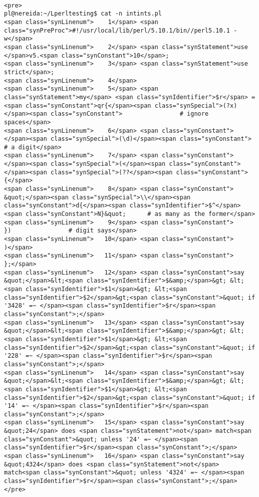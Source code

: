 \begin{verbatim}

<pre>
pl@nereida:~/Lperltesting$ cat -n intints.pl
<span class="synLinenum">    1</span> <span class="synPreProc">#!/usr/local/lib/perl/5.10.1/bin//perl5.10.1 -w</span>
<span class="synLinenum">    2</span> <span class="synStatement">use </span>v5.<span class="synConstant">10</span>;
<span class="synLinenum">    3</span> <span class="synStatement">use strict</span>;
<span class="synLinenum">    4</span> 
<span class="synLinenum">    5</span> <span class="synStatement">my</span> <span class="synIdentifier">$r</span> = <span class="synConstant">qr{</span><span class="synSpecial">(?x)</span><span class="synConstant">                # ignore spaces</span>
<span class="synLinenum">    6</span> <span class="synConstant">           </span><span class="synSpecial">(\d)</span><span class="synConstant">                # a digit</span>
<span class="synLinenum">    7</span> <span class="synConstant">           </span><span class="synSpecial">(</span><span class="synConstant"> </span><span class="synSpecial">(??</span><span class="synConstant">{</span>
<span class="synLinenum">    8</span> <span class="synConstant">               &quot;</span><span class="synSpecial">\\</span><span class="synConstant">d{</span><span class="synIdentifier">$^</span><span class="synConstant">N}&quot;      # as many as the former</span>
<span class="synLinenum">    9</span> <span class="synConstant">             })                # digit says</span>
<span class="synLinenum">   10</span> <span class="synConstant">           )</span>
<span class="synLinenum">   11</span> <span class="synConstant">          };</span>
<span class="synLinenum">   12</span> <span class="synConstant">say &quot;</span>&lt;<span class="synIdentifier">$&amp;</span>&gt; &lt;<span class="synIdentifier">$1</span>&gt; &lt;<span class="synIdentifier">$2</span>&gt;<span class="synConstant">&quot; if '3428' =~ </span><span class="synIdentifier">$r</span><span class="synConstant">;</span>
<span class="synLinenum">   13</span> <span class="synConstant">say &quot;</span>&lt;<span class="synIdentifier">$&amp;</span>&gt; &lt;<span class="synIdentifier">$1</span>&gt; &lt;<span class="synIdentifier">$2</span>&gt;<span class="synConstant">&quot; if '228' =~ </span><span class="synIdentifier">$r</span><span class="synConstant">;</span>
<span class="synLinenum">   14</span> <span class="synConstant">say &quot;</span>&lt;<span class="synIdentifier">$&amp;</span>&gt; &lt;<span class="synIdentifier">$1</span>&gt; &lt;<span class="synIdentifier">$2</span>&gt;<span class="synConstant">&quot; if '14' =~ </span><span class="synIdentifier">$r</span><span class="synConstant">;</span>
<span class="synLinenum">   15</span> <span class="synConstant">say &quot;24</span> does <span class="synStatement">not</span> match<span class="synConstant">&quot; unless '24' =~ </span><span class="synIdentifier">$r</span><span class="synConstant">;</span>
<span class="synLinenum">   16</span> <span class="synConstant">say &quot;4324</span> does <span class="synStatement">not</span> match<span class="synConstant">&quot; unless '4324' =~ </span><span class="synIdentifier">$r</span><span class="synConstant">;</span>
</pre>


\end{verbatim}
